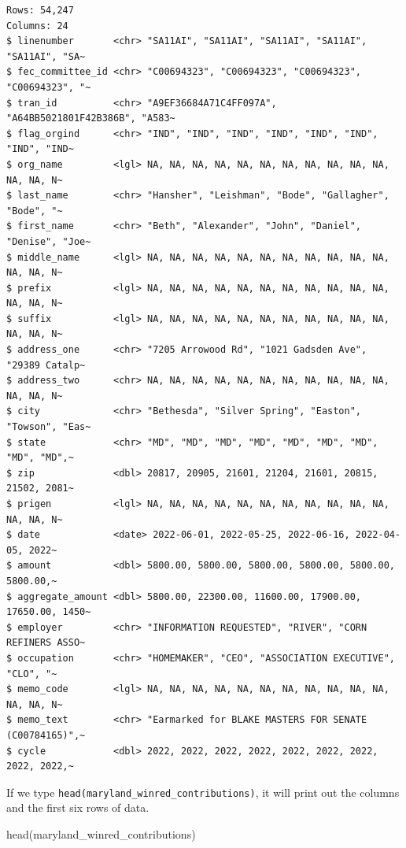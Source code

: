 \documentclass[
  letterpaper,
  DIV=11,
  numbers=noendperiod]{scrreprt}
\newenvironment{Shaded}{\begin{snugshade}}{\end{snugshade}}
\newcommand{\FunctionTok}[1]{\textcolor[rgb]{0.28,0.35,0.67}{#1}}
\newcommand{\NormalTok}[1]{\textcolor[rgb]{0.00,0.23,0.31}{#1}}
\begin{document}
\begin{verbatim}
Rows: 54,247
Columns: 24
$ linenumber       <chr> "SA11AI", "SA11AI", "SA11AI", "SA11AI", "SA11AI", "SA~
$ fec_committee_id <chr> "C00694323", "C00694323", "C00694323", "C00694323", "~
$ tran_id          <chr> "A9EF36684A71C4FF097A", "A64BB5021801F42B386B", "A583~
$ flag_orgind      <chr> "IND", "IND", "IND", "IND", "IND", "IND", "IND", "IND~
$ org_name         <lgl> NA, NA, NA, NA, NA, NA, NA, NA, NA, NA, NA, NA, NA, N~
$ last_name        <chr> "Hansher", "Leishman", "Bode", "Gallagher", "Bode", "~
$ first_name       <chr> "Beth", "Alexander", "John", "Daniel", "Denise", "Joe~
$ middle_name      <lgl> NA, NA, NA, NA, NA, NA, NA, NA, NA, NA, NA, NA, NA, N~
$ prefix           <lgl> NA, NA, NA, NA, NA, NA, NA, NA, NA, NA, NA, NA, NA, N~
$ suffix           <lgl> NA, NA, NA, NA, NA, NA, NA, NA, NA, NA, NA, NA, NA, N~
$ address_one      <chr> "7205 Arrowood Rd", "1021 Gadsden Ave", "29389 Catalp~
$ address_two      <chr> NA, NA, NA, NA, NA, NA, NA, NA, NA, NA, NA, NA, NA, N~
$ city             <chr> "Bethesda", "Silver Spring", "Easton", "Towson", "Eas~
$ state            <chr> "MD", "MD", "MD", "MD", "MD", "MD", "MD", "MD", "MD",~
$ zip              <dbl> 20817, 20905, 21601, 21204, 21601, 20815, 21502, 2081~
$ prigen           <lgl> NA, NA, NA, NA, NA, NA, NA, NA, NA, NA, NA, NA, NA, N~
$ date             <date> 2022-06-01, 2022-05-25, 2022-06-16, 2022-04-05, 2022~
$ amount           <dbl> 5800.00, 5800.00, 5800.00, 5800.00, 5800.00, 5800.00,~
$ aggregate_amount <dbl> 5800.00, 22300.00, 11600.00, 17900.00, 17650.00, 1450~
$ employer         <chr> "INFORMATION REQUESTED", "RIVER", "CORN REFINERS ASSO~
$ occupation       <chr> "HOMEMAKER", "CEO", "ASSOCIATION EXECUTIVE", "CLO", "~
$ memo_code        <lgl> NA, NA, NA, NA, NA, NA, NA, NA, NA, NA, NA, NA, NA, N~
$ memo_text        <chr> "Earmarked for BLAKE MASTERS FOR SENATE (C00784165)",~
$ cycle            <dbl> 2022, 2022, 2022, 2022, 2022, 2022, 2022, 2022, 2022,~
\end{verbatim}

If we type \texttt{head(maryland\_winred\_contributions)}, it will print
out the columns and the first six rows of data.

\begin{Shaded}
\begin{Highlighting}[]
\FunctionTok{head}\NormalTok{(maryland\_winred\_contributions)}
\end{Highlighting}
\end{Shaded}
\end{document}
